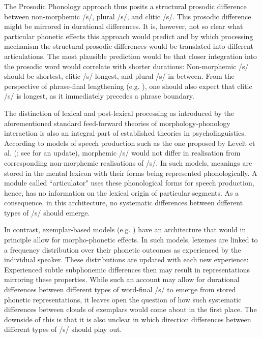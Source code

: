 The Prosodic Phonology approach thus posits a structural prosodic difference between non-morphemic /s/, plural /s/, and clitic /s/. This prosodic difference might be mirrored in durational differences. It is, however, not so clear what particular phonetic effects this approach would predict and by which processing mechanism the structural prosodic differences would be translated into different articulations. The most plausible prediction would be that closer integration into the prosodic word would correlate with shorter durations: Non-morphemic /s/ should be shortest, clitic /s/ longest, and plural /s/ in between. From the perspective of phrase-final lengthening (e.g. \cite{Klatt1976, Wightman1992}), one should also expect that clitic /s/ is longest, as it immediately precedes a phrase boundary.

The distinction of lexical and post-lexical processing as introduced by the aforementioned standard feed-forward theories of morphology-phonology interaction is also an integral part of established theories in psycholinguistics. According to models of speech production such as the one proposed by Levelt et al. (\cite{Levelt1999}; see \cite{Roelofs2019} for an update), morphemic /s/ would not differ in realisation from corresponding non-morphemic realisations of /s/. In such models, meanings are stored in the mental lexicon with their forms being represented phonologically. A module called ``articulator" uses these phonological forms for speech production, hence, has no information on the lexical origin of particular segments. As a consequence, in this architecture, no systematic differences between different types of /s/ should emerge.

In contrast, exemplar-based models (e.g. \cite{Goldinger1998, Bybee2001, Pierrehumbert2001, Pierrehumbert2002, Gahl2006}) have an architecture that would in principle allow for morpho-phonetic effects. In such models, lexemes are linked to a frequency distribution over their phonetic outcomes as experienced by the individual speaker. These distributions are updated with each new experience: Experienced subtle subphonemic differences then may result in representations mirroring these properties. While such an account may allow for durational differences between different types of word-final /s/ to emerge from stored phonetic representations, it leaves open the question of how such systematic differences between clouds of exemplars would come about in the first place. The downside of this is that it is also unclear in which direction differences between different types of /s/ should play out.

